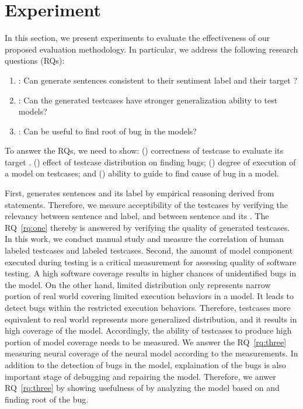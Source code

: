 \section{Experiment}
\label{sec:experiment}
%


In this section, we present experiments to evaluate the effectiveness
of our proposed evaluation methodology. In particular, we address the
following research questions (RQs):

\begin{enumerate}[label=\textbf{RQ\arabic*}]
\item \label{rq:one}: Can \tool generate sentences consistent to their
  sentiment label and their target \lc?
\item \label{rq:two}: Can the \tool generated testcases have stronger
  generalization ability to test \sa models?
\item \label{rq:three}: Can \tool be useful to find root of bug in the
  \sa models?
\end{enumerate}

To answer the RQs, we need to show: () correctness of testcase to
evaluate its target \lc.  () effect of testcase distribution on
finding bugs; () degree of execution of a \sa model on testcases;
and () ability to guide to find cause of bug in a \sa
model.

First, \tool generates sentences and its label by empirical reasoning
derived from \lc statements. Therefore, we meaure acceptibility of the
testcases by verifying the relevancy between sentence and label, and
between sentence and its \lc. The RQ~\ref{rq:one} thereby is answered
by verifying the quality of generated testcases. In this work, we
conduct manual study and measure the correlation of human labeled
testcases and \tool labeled testcases. Second, the amount of \sa model
component executed during testing is a critical measurement for
assessing quality of software testing. A high software coverage
results in higher chances of unidentified bugs in the \sa model. On
the other hand, limited distribution only represents narrow portion of
real world covering limited execution behaviors in a \sa model. It leads
to detect bugs within the restricted execution behaviors.  Therefore,
testcases more equivalent to real world represents more generalized
distribution, and it results in high coverage of the \sa model.
Accordingly, the ability of testcases to produce high portion of model
coverage needs to be measured. We answer the RQ~\ref{rq:three}
measuring neural coverage of the neural \sa model according to the
measurements. In addition to the detection of bugs in the model,
explaination of the bugs is also important stage of debugging and
repairing the model. Therefore, we anwer RQ~\ref{rq:three} by showing
usefulness of \tool by analyzing the \sa model based on \tool and
finding root of the bug.

